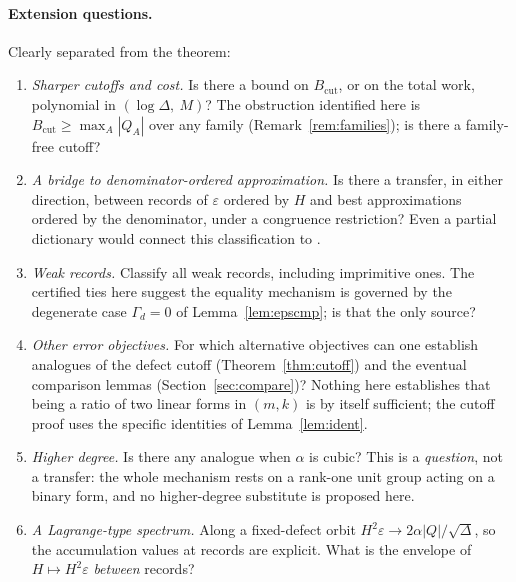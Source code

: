 \documentclass[11pt]{article}
\theoremstyle{definition}
\theoremstyle{remark}
\begin{document}
\paragraph{Extension questions.} Clearly separated from the theorem:
\begin{enumerate}\itemsep2pt
\item \emph{Sharper cutoffs and cost.} Is there a bound on $B_{\mathrm{cut}}$, or on the total
work, polynomial in $(\log\Delta,\ M)$? The obstruction identified here is
$B_{\mathrm{cut}}\ge\max_A|Q_A|$ over any family (Remark~\ref{rem:families}); is there a
family-free cutoff?
\item \emph{A bridge to denominator-ordered approximation.} Is there a transfer, in either
direction, between records of $\varepsilon$ ordered by $H$ and best approximations ordered by
the denominator, under a congruence restriction? Even a partial dictionary would connect this
classification to \cite{KimLeeLiao2022,KimLeeLiao2025,Elsner2000}.
\item \emph{Weak records.} Classify all weak records, including imprimitive ones. The certified
ties here suggest the equality mechanism is governed by the degenerate case $\Gamma_d=0$ of
Lemma~\ref{lem:epscmp}; is that the only source?
\item \emph{Other error objectives.} For which alternative objectives can one establish
analogues of the defect cutoff (Theorem~\ref{thm:cutoff}) and the eventual comparison lemmas
(Section~\ref{sec:compare})? Nothing here establishes that being a ratio of two linear forms in
$(m,k)$ is by itself sufficient; the cutoff proof uses the specific identities of
Lemma~\ref{lem:ident}.
\item \emph{Higher degree.} Is there any analogue when $\alpha$ is cubic? This is a
\emph{question}, not a transfer: the whole mechanism rests on a rank-one unit group acting on a
binary form, and no higher-degree substitute is proposed here.
\item \emph{A Lagrange-type spectrum.} Along a fixed-defect orbit
$H^2\varepsilon\to2\alpha|Q|/\sqrt\Delta$, so the accumulation values at records are explicit.
What is the envelope of $H\mapsto H^2\varepsilon$ \emph{between} records?
\end{enumerate}
\end{document}
